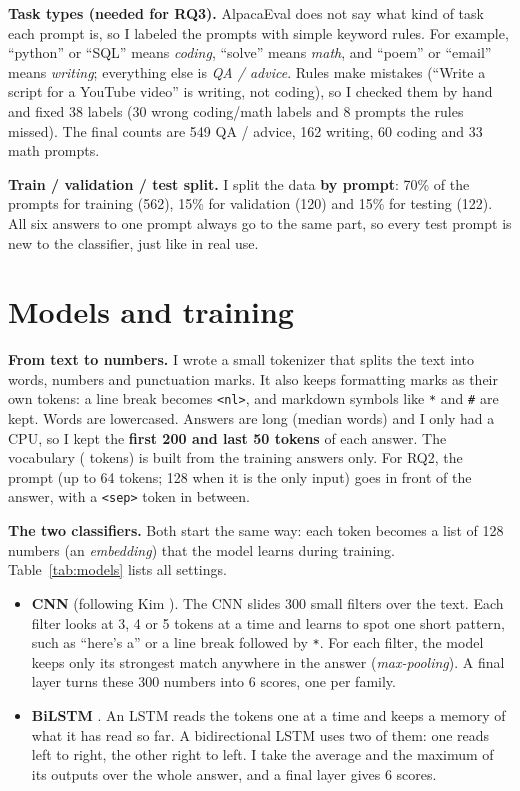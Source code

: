 \documentclass[11pt,letterpaper]{article}
\newcommand{\ttt}[1]{\texttt{\small #1}}
\begin{document}
\textbf{Task types (needed for RQ3).} AlpacaEval does not say what kind of task each prompt is, so I labeled the
prompts with simple keyword rules. For example, ``python'' or ``SQL'' means \emph{coding}, ``solve'' means
\emph{math}, and ``poem'' or ``email'' means \emph{writing}; everything else is \emph{QA / advice}. Rules make
mistakes (``Write a script for a YouTube video'' is writing, not coding), so I checked them by hand and fixed 38
labels (30 wrong coding/math labels and 8 prompts the rules missed). The final counts are 549 QA / advice, 162 writing, 60 coding and 33 math prompts.

\textbf{Train / validation / test split.} I split the data \textbf{by prompt}: 70\% of the prompts for training
(562), 15\% for validation (120) and 15\% for testing (122). All six answers to one prompt always go to the same
part, so every test prompt is new to the classifier, just like in real use.

\section{Models and training}

\textbf{From text to numbers.} I wrote a small tokenizer that splits the text into words, numbers and punctuation
marks. It also keeps formatting marks as their own tokens: a line break becomes \ttt{<nl>}, and markdown symbols
like \ttt{**} and \ttt{\#} are kept. Words are lowercased. Answers are long (median \MedianWords{} words) and I
only had a CPU, so I kept the \textbf{first 200 and last 50 tokens} of each answer. The vocabulary
(\CnnVocab{} tokens) is built from the training answers only. For RQ2, the prompt (up to 64 tokens; 128 when it is the
only input) goes in front of the answer, with a \ttt{<sep>} token in between.

\textbf{The two classifiers.} Both start the same way: each token becomes a list of 128 numbers (an
\emph{embedding}) that the model learns during training. Table~\ref{tab:models} lists all settings.
\begin{itemize}
  \item \textbf{CNN} (following Kim \cite{kim2014}). The CNN slides 300 small filters over the text. Each filter
        looks at 3, 4 or 5 tokens at a time and learns to spot one short pattern, such as ``here's a'' or a line
        break followed by \ttt{**}. For each filter, the model keeps only its strongest match anywhere in the
        answer (\emph{max-pooling}). A final layer turns these 300 numbers into 6 scores, one per family.
  \item \textbf{BiLSTM} \cite{lstm}. An LSTM reads the tokens one at a time and keeps a memory of what it has
        read so far. A bidirectional LSTM uses two of them: one reads left to right, the other right to left. I
        take the average and the maximum of its outputs over the whole answer, and a final layer gives 6 scores.
\end{itemize}
\end{document}

